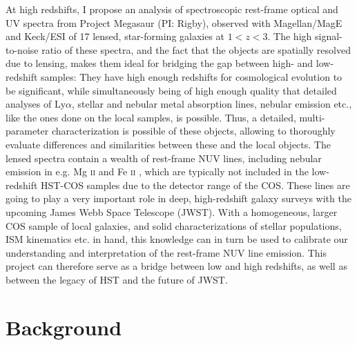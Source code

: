 \documentclass[10pt, letterpaper, headings=Large, DIV=14]{scrartcl}
\begin{document}
At high redshifts, I propose an analysis of spectroscopic rest-frame optical and
UV spectra from Project Megasaur (PI: Rigby), observed with Magellan/MagE and
Keck/ESI of 17 lensed, star-forming galaxies at $1 < z < 3$. The high
signal-to-noise ratio of these spectra, and the fact that the objects are
spatially resolved due to lensing, makes them ideal for bridging the gap between
high- and low-redshift samples: They have high enough redshifts for cosmological
evolution to be significant, while simultaneously being of high enough quality
that detailed analyses of Ly$\alpha$, stellar and nebular metal absorption
lines, nebular emission etc., like the ones done on the local samples, is
possible. Thus, a detailed, multi-parameter characterization is possible of
these objects, allowing to thoroughly evaluate differences and similarities
between these and the local objects.  The lensed spectra contain a wealth of
rest-frame NUV lines, including nebular emission in e.g. Mg \textsc{ii} and Fe
\textsc{ii} \citep[see e.g.][]{Bordoloi2016,Rigby2015}, which are typically not
included in the low-redshift HST-COS samples due to the detector range of the
COS. These lines are going to play a very important role in deep, high-redshift
galaxy surveys with the upcoming James Webb Space Telescope (JWST). With a
homogeneous, larger COS sample of local galaxies, and solid characterizations of
stellar populations, ISM kinematics etc. in hand, this knowledge can in turn be
used to calibrate our understanding and interpretation of the rest-frame NUV
line emission.  This project can therefore serve as a bridge between low and high
redshifts, as well as between the legacy of HST and the future of JWST. 


\section*{Background}
\end{document}
